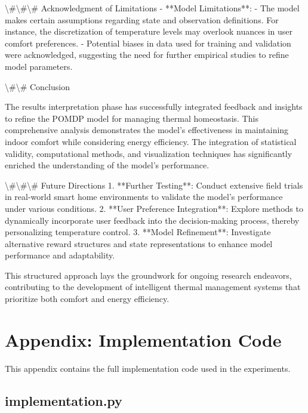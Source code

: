 \documentclass[11pt,a4paper]{article}
\begin{document}
\textbackslash{}#\textbackslash{}#\textbackslash{}# Acknowledgment of Limitations
- **Model Limitations**: 
  - The model makes certain assumptions regarding state and observation definitions. For instance, the discretization of temperature levels may overlook nuances in user comfort preferences.
  - Potential biases in data used for training and validation were acknowledged, suggesting the need for further empirical studies to refine model parameters.

\textbackslash{}#\textbackslash{}# Conclusion

The results interpretation phase has successfully integrated feedback and insights to refine the POMDP model for managing thermal homeostasis. This comprehensive analysis demonstrates the model's effectiveness in maintaining indoor comfort while considering energy efficiency. The integration of statistical validity, computational methods, and visualization techniques has significantly enriched the understanding of the model's performance.

\textbackslash{}#\textbackslash{}#\textbackslash{}# Future Directions
1. **Further Testing**: Conduct extensive field trials in real-world smart home environments to validate the model's performance under various conditions.
2. **User Preference Integration**: Explore methods to dynamically incorporate user feedback into the decision-making process, thereby personalizing temperature control.
3. **Model Refinement**: Investigate alternative reward structures and state representations to enhance model performance and adaptability.

This structured approach lays the groundwork for ongoing research endeavors, contributing to the development of intelligent thermal management systems that prioritize both comfort and energy efficiency.
\section{Appendix: Implementation Code}

This appendix contains the full implementation code used in the experiments.


\subsection{implementation.py}
\end{document}
